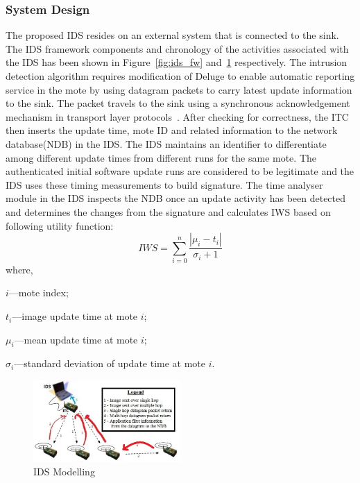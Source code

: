\documentclass[conference]{IEEEtran}
\begin{document}
\subsubsection*{System Design}
The proposed IDS resides on an external system that is connected to the sink.
The IDS framework components and chronology of the activities associated with the IDS has been shown in Figure~\ref{fig:ids_fw} and~\ref{fig:ids_model} respectively.
The intrusion detection algorithm requires modification of Deluge to enable automatic reporting service in the mote by using datagram packets to carry latest update information to the sink.
The packet travels to the sink using a synchronous acknowledgement mechanism in transport layer protocols~\cite{tep116}.
After checking for correctness, the ITC then inserts the update time, mote ID and related information to the network database(NDB) in the IDS.
The IDS maintains an identifier to differentiate among different update times from different runs for the same mote.
The authenticated initial software update runs are considered to be legitimate and the IDS uses these timing measurements to build signature.
The time analyser module in the IDS inspects the NDB once an update activity has been detected and determines the changes from the signature and calculates IWS based on following utility function:
\begin{equation}
\label{eqn2} 
	\mathit{IWS} = \sum \limits_{i=0}^{n} \frac{\left| \mu_i - t_i \right|}{\sigma_i + 1}
\end{equation}
where, 
\begin{inparaenum}
\item $\mathit{i}$---mote index;%
\item $\mathit{t_i}$---image update time at mote $\mathit{i}$;  
\item $\mathit{\mu_i}$---mean update time at mote $\mathit{i}$;  
\item $\mathit{\sigma_i}$---standard deviation of update time at mote $\mathit{i}$. 
\end{inparaenum}	
\begin{figure}[btp]
    \centering
    \includegraphics[width=0.5\textwidth]{IDS}
    \caption{IDS Modelling}
    \label{fig:ids_model}
\end{figure}
\end{document}
